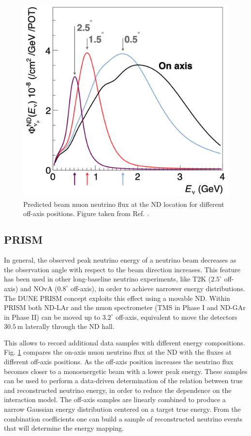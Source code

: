\begin{figure}[t]
	\centering
	\includegraphics[width=0.55\linewidth]{Images/DUNE/ND/prism_spectra}
	\caption[Predicted beam muon neutrino flux at the ND location for different off-axis positions.]{Predicted beam muon neutrino flux at the ND location for different off-axis positions. Figure taken from Ref. \cite{DUNE2021NDCDR}.}
	\label{fig:dune_prism}
\end{figure}

\subsection{PRISM}

In general, the observed peak neutrino energy of a neutrino beam decreases as the observation angle with respect to the beam direction increases. This feature has been used in other long-baseline neutrino experiments, like T2K ($2.5^{\circ}$ off-axis) and NOvA ($0.8^{\circ}$ off-axis), in order to achieve narrower energy distributions. The DUNE PRISM concept exploits this effect using a movable ND. Within PRISM both ND-LAr and the muon spectrometer (TMS in Phase I and ND-GAr in Phase II) can be moved up to $3.2^{\circ}$ off-axis, equivalent to move the detectors $30.5~\mathrm{m}$ laterally through the ND hall.

This allows to record additional data samples with different energy compositions. Fig. \ref{fig:dune_prism} compares the on-axis muon neutrino flux at the ND with the fluxes at different off-axis positions. As the off-axis position increases the neutrino flux becomes closer to a monoenergetic beam with a lower peak energy. These samples can be used to perform a data-driven determination of the relation between true and reconstructed neutrino energy, in order to reduce the dependence on the interaction model. The off-axis samples are linearly combined to produce a narrow Gaussian energy distribution centered on a target true energy. From the combination coefficients one can build a sample of reconstructed neutrino events that will determine the energy mapping.


